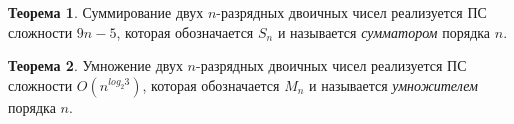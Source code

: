 \textbf{Теорема 1}. Суммирование двух $n$-разрядных двоичных чисел реализуется ПС сложности $9n-5$, которая обозначается $S_n$ и называется \textit{сумматором} порядка $n$.

\textbf{Теорема 2}. Умножение двух $n$-разрядных двоичных чисел реализуется ПС сложности $O(n^{log_2 3})$, которая обозначается $M_n$ и называется \textit{умножителем} порядка $n$.